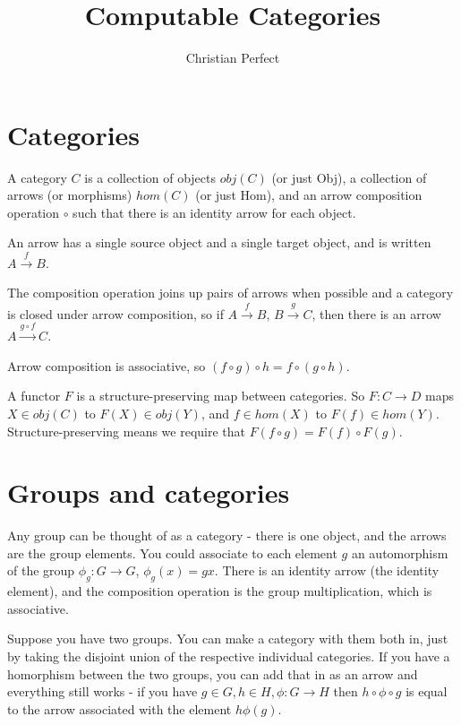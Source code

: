 \documentclass[a4paper]{article}
\theoremstyle{plain}
\theoremstyle{definition}
\begin{document}
\title{Computable Categories}
\author{Christian Perfect}
\maketitle

\section{Categories}

A category $C$ is a collection of objects $obj(C)$ (or just Obj), a collection of arrows (or morphisms) $hom(C)$ (or just Hom), and an arrow composition operation $\circ$ such that there is an identity arrow for each object.

An arrow has a single source object and a single target object, and is written $A \overset{f}{\rightarrow} B$.

The composition operation joins up pairs of arrows when possible and a category is closed under arrow composition, so if $A \overset{f}{\rightarrow} B$, $B \overset{g}{\rightarrow} C$, then there is an arrow $A \overset{g \circ f}{\rightarrow} C$.

Arrow composition is associative, so $(f \circ g) \circ h = f \circ (g \circ h)$.

A functor $F$ is a structure-preserving map between categories. So $F: C \rightarrow D$ maps $X \in obj(C)$ to $F(X) \in obj(Y)$, and $f \in hom(X)$ to $F(f) \in hom(Y)$. Structure-preserving means we require that $F(f \circ g) = F(f) \circ F(g)$.

\section{Groups and categories}

Any group can be thought of as a category - there is one object, and the arrows are the group elements. You could associate to each element $g$ an automorphism of the group $\phi_g : G \rightarrow G$, $\phi_g(x) = gx$. There is an identity arrow (the identity element), and the composition operation is the group multiplication, which is associative.

Suppose you have two groups. You can make a category with them both in, just by taking the disjoint union of the respective individual categories. If you have a homorphism between the two groups, you can add that in as an arrow and everything still works - if you have $g \in G, h \in H, \phi: G \rightarrow H$ then $h \circ \phi \circ g$ is equal to the arrow associated with the element $h\phi(g)$.
\end{document}
